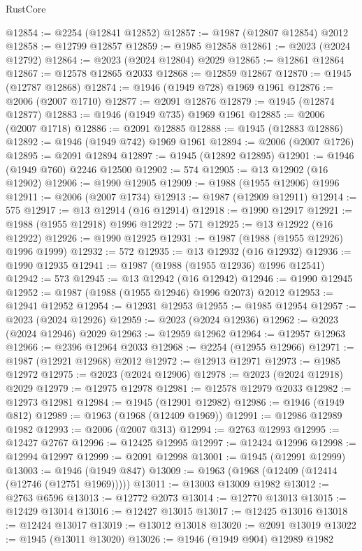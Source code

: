 \begin{lexlean}{RustCore}
\begin{coremodule}
@12854 := @2254 (@12841 @12852)
@12857 := @1987 (@12807 @12854) @2012
@12858 := @12799 @12857
@12859 := @1985 @12858
@12861 := @2023 (@2024 @12792)
@12864 := @2023 (@2024 @12804) @2029
@12865 := @12861 @12864
@12867 := @12578 @12865 @2033
@12868 := @12859 @12867
@12870 := @1945 (@12787 @12868)
@12874 := @1946 (@1949 @728) @1969 @1961
@12876 := @2006 (@2007 @1710)
@12877 := @2091 @12876
@12879 := @1945 (@12874 @12877)
@12883 := @1946 (@1949 @735) @1969 @1961
@12885 := @2006 (@2007 @1718)
@12886 := @2091 @12885
@12888 := @1945 (@12883 @12886)
@12892 := @1946 (@1949 @742) @1969 @1961
@12894 := @2006 (@2007 @1726)
@12895 := @2091 @12894
@12897 := @1945 (@12892 @12895)
@12901 := @1946 (@1949 @760) @2246 @12500
@12902 := 574
@12905 := @13 @12902 (@16 @12902)
@12906 := @1990 @12905
@12909 := @1988 (@1955 @12906) @1996
@12911 := @2006 (@2007 @1734)
@12913 := @1987 (@12909 @12911)
@12914 := 575
@12917 := @13 @12914 (@16 @12914)
@12918 := @1990 @12917
@12921 := @1988 (@1955 @12918) @1996
@12922 := 571
@12925 := @13 @12922 (@16 @12922)
@12926 := @1990 @12925
@12931 := @1987 (@1988 (@1955 @12926) @1996 @1999)
@12932 := 572
@12935 := @13 @12932 (@16 @12932)
@12936 := @1990 @12935
@12941 := @1987 (@1988 (@1955 @12936) @1996 @12541)
@12942 := 573
@12945 := @13 @12942 (@16 @12942)
@12946 := @1990 @12945
@12952 := @1987 (@1988 (@1955 @12946) @1996 @2073) @2012
@12953 := @12941 @12952
@12954 := @12931 @12953
@12955 := @1985 @12954
@12957 := @2023 (@2024 @12926)
@12959 := @2023 (@2024 @12936)
@12962 := @2023 (@2024 @12946) @2029
@12963 := @12959 @12962
@12964 := @12957 @12963
@12966 := @2396 @12964 @2033
@12968 := @2254 (@12955 @12966)
@12971 := @1987 (@12921 @12968) @2012
@12972 := @12913 @12971
@12973 := @1985 @12972
@12975 := @2023 (@2024 @12906)
@12978 := @2023 (@2024 @12918) @2029
@12979 := @12975 @12978
@12981 := @12578 @12979 @2033
@12982 := @12973 @12981
@12984 := @1945 (@12901 @12982)
@12986 := @1946 (@1949 @812)
@12989 := @1963 (@1968 (@12409 @1969))
@12991 := @12986 @12989 @1982
@12993 := @2006 (@2007 @313)
@12994 := @2763 @12993
@12995 := @12427 @2767
@12996 := @12425 @12995
@12997 := @12424 @12996
@12998 := @12994 @12997
@12999 := @2091 @12998
@13001 := @1945 (@12991 @12999)
@13003 := @1946 (@1949 @847)
@13009 := @1963 (@1968 (@12409 (@12414 (@12746 (@12751 @1969)))))
@13011 := @13003 @13009 @1982
@13012 := @2763 @6596
@13013 := @12772 @2073
@13014 := @12770 @13013
@13015 := @12429 @13014
@13016 := @12427 @13015
@13017 := @12425 @13016
@13018 := @12424 @13017
@13019 := @13012 @13018
@13020 := @2091 @13019
@13022 := @1945 (@13011 @13020)
@13026 := @1946 (@1949 @904) @12989 @1982

\end{coremodule}
\end{lexlean}
